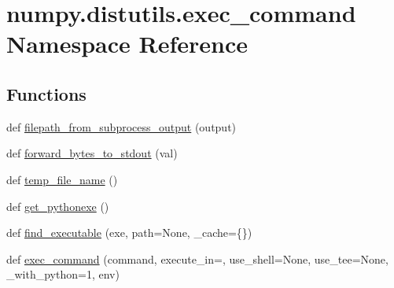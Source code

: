 \hypertarget{namespacenumpy_1_1distutils_1_1exec__command}{}\section{numpy.\+distutils.\+exec\+\_\+command Namespace Reference}
\label{namespacenumpy_1_1distutils_1_1exec__command}
\subsection*{Functions}
\begin{DoxyCompactItemize}
\item 
def \hyperlink{namespacenumpy_1_1distutils_1_1exec__command_a8ab80ad3b0509e86b733672611ff9642}{filepath\+\_\+from\+\_\+subprocess\+\_\+output} (output)
\item 
def \hyperlink{namespacenumpy_1_1distutils_1_1exec__command_a3cd3421a69e8e2884723e8334e866a0e}{forward\+\_\+bytes\+\_\+to\+\_\+stdout} (val)
\item 
def \hyperlink{namespacenumpy_1_1distutils_1_1exec__command_a872f1dcbe44528dfbad63400c2e751ae}{temp\+\_\+file\+\_\+name} ()
\item 
def \hyperlink{namespacenumpy_1_1distutils_1_1exec__command_a12ae23b81b1ba23d159bb59baaff0db7}{get\+\_\+pythonexe} ()
\item 
def \hyperlink{namespacenumpy_1_1distutils_1_1exec__command_a9ad5db20f4885acfc4b50e57c0408732}{find\+\_\+executable} (exe, path=None, \+\_\+cache=\{\})
\item 
def \hyperlink{namespacenumpy_1_1distutils_1_1exec__command_ac3ebe717bf449d45c7f3c6ace8252b16}{exec\+\_\+command} (command, execute\+\_\+in=\textquotesingle{}\textquotesingle{}, use\+\_\+shell=None, use\+\_\+tee=None, \+\_\+with\+\_\+python=1, env)
\end{DoxyCompactItemize}


